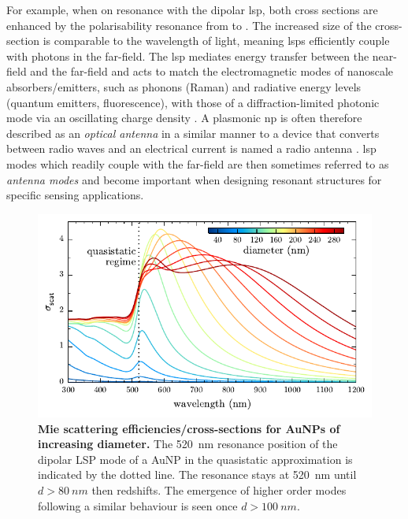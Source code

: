 \documentclass{article}
\begin{document}
For example, when on resonance with the dipolar \gls{lsp}, both cross sections are enhanced by the polarisability resonance from  to . The increased size of the cross-section is comparable to the wavelength of light, meaning \glspl{lsp} efficiently couple with photons in the far-field. The \gls{lsp} mediates energy transfer between the near-field and the far-field and acts to match the electromagnetic modes of nanoscale absorbers/emitters, such as phonons (Raman) and radiative energy levels (quantum emitters, fluorescence), with those of a diffraction-limited photonic mode via an oscillating charge density \cite{berweger2012}. A plasmonic \gls{np} is often therefore described as an \textit{optical antenna} in a similar manner to a device that converts between radio waves and an electrical current is named a radio antenna \cite{bharadwaj2009, novotny2011}. \Gls{lsp} modes which readily couple with the far-field are then sometimes referred to as \emph{antenna modes} and become important when designing resonant structures for specific sensing applications.

\begin{figure}[bt]
\centering
\includegraphics{figures/mie_scattering}
\caption[Mie scattering cross-sections for AuNPs of increasing diameter]{\textbf{Mie scattering {\color{red}efficiencies/cross-sections} for AuNPs of increasing diameter.} The \SI{520}{nm} resonance position of the dipolar LSP mode of a AuNP in the quasistatic approximation is indicated by the dotted line. The resonance stays at \SI{520}{nm} until $d>\SI{80}{nm}$ then redshifts. The emergence of higher order modes following a similar behaviour is seen once $d>\SI{100}{nm}$.}
\label{fig:mie_scattering}
\end{figure}
\end{document}
